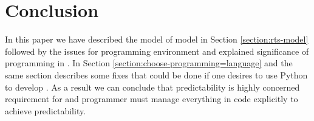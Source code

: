 \section{Conclusion}\label{section:conclusion}
In this paper we have described the model of \rtsS model in Section \ref{section:rts-model} followed by the issues for programming environment and explained significance of programming in \rtsS. In Section \ref{section:choose-programming=language} and the same section describes some fixes that could be done if one desires to use Python to develop \rts. As a result we can conclude that predictability is highly concerned requirement for \rtsS and programmer must manage everything in code explicitly to achieve predictability.